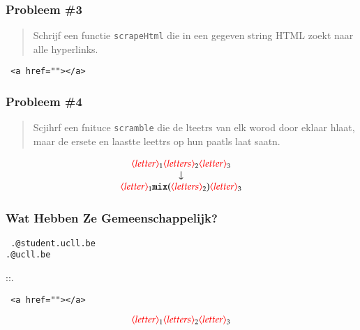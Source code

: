 \begin{frame}
  \frametitle{Probleem \#3}
  \begin{quote}
    Schrijf een functie \texttt{scrapeHtml} die in een gegeven string HTML
    zoekt naar alle hyperlinks.
  \end{quote}
  \vskip2mm
  \begin{center}\tt
    <a href=""></a>
  \end{center}
\end{frame}

\begin{frame}
  \frametitle{Probleem \#4}
  \begin{quote}
    Scjihrf een fnituce	\texttt{scramble} die de
    lteetrs van elk worod door eklaar hlaat, maar de ersete
    en laastte leettrs op hun paatls laat saatn.
  \end{quote}
  \vskip2mm
  \[
    \begin{array}{c}
      {\color{red} \ensuremath{\langle}letter\ensuremath{\rangle}}_1{\color{red} \langle letters\rangle}_2{\color{red} \langle letter\rangle}_3 \\
      \downarrow \\
      {\color{red} \langle letter\rangle}_1\texttt{mix}({\color{red} \langle letters\rangle}_2){\color{red} \langle letter\rangle}_3
    \end{array}
  \]
\end{frame}

\begin{frame}
  \frametitle{Wat Hebben Ze Gemeenschappelijk?}
  \begin{center}\tt
    .@student.ucll.be \\
    .@ucll.be \\
  \end{center}
  \begin{center}
    ::.
  \end{center}
  \begin{center}\tt
    <a href=""></a>
  \end{center}
  \[
    {\color{red} \langle letter\rangle}_1{\color{red} \langle letters\rangle}_2{\color{red} \langle letter\rangle}_3
  \]
  \vskip5mm
  \begin{center}
  \end{center}
\end{frame}


